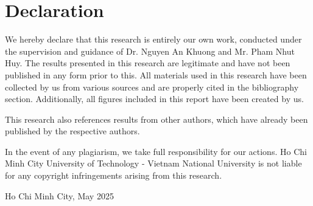 \chapter*{Declaration}

We hereby declare that this research is entirely our own work, conducted under the supervision and guidance of Dr. Nguyen An Khuong and Mr. Pham Nhut Huy. The results presented in this research are legitimate and have not been published in any form prior to this. All materials used in this research have been collected by us from various sources and are properly cited in the bibliography section. Additionally, all figures included in this report have been created by us. 

This research also references results from other authors, which have already been published by the respective authors. 

In the event of any plagiarism, we take full responsibility for our actions. Ho Chi Minh City University of Technology - Vietnam National University is not liable for any copyright infringements arising from this research.

\vspace{2cm}
\begin{flushright}
Ho Chi Minh City, May 2025\\
\vspace{3mm}
\\
% 
\end{flushright}


